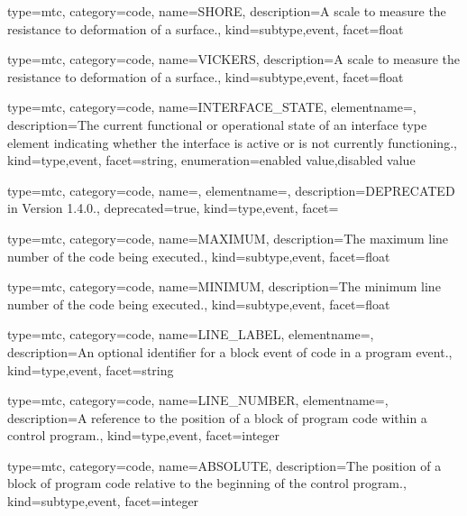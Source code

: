 {
  type=mtc,
  category=code,
  name={SHORE},
  description={A scale to measure the resistance to deformation of a surface.},
  kind={subtype,event},
  facet={\gls{float}}
}


{
  type=mtc,
  category=code,
  name={VICKERS},
  description={A scale to measure the resistance to deformation of a surface.},
  kind={subtype,event},
  facet={\gls{float}}
}


{
  type=mtc,
  category=code,
  name={INTERFACE\_STATE},
  elementname=,
  description={The current functional or operational state of an \gls{interface} type element indicating whether the interface is active or is not currently functioning.},
  kind={type,event},
  facet={\gls{string}},
  enumeration={\gls{enabled value},\gls{disabled value}}
}


{
  type=mtc,
  category=code,
  name=,
  elementname=,
  description={DEPRECATED in Version 1.4.0.},
  deprecated={true},
  kind={type,event},
  facet={}
}


{
  type=mtc,
  category=code,
  name={MAXIMUM},
  description={The maximum line number of the code being executed.},
  kind={subtype,event},
  facet={\gls{float}}
}


{
  type=mtc,
  category=code,
  name={MINIMUM},
  description={The minimum line number of the code being executed.},
  kind={subtype,event},
  facet={\gls{float}}
}


{
  type=mtc,
  category=code,
  name={LINE\_LABEL},
  elementname=,
  description={An optional identifier for a \gls{block event} of code in a \gls{program event}.},
  kind={type,event},
  facet={\gls{string}}
}


{
  type=mtc,
  category=code,
  name={LINE\_NUMBER},
  elementname=,
  description={A reference to the position of a block of program code within a control program.},
  kind={type,event},
  facet={\gls{integer}}
}


{
  type=mtc,
  category=code,
  name={ABSOLUTE},
  description={The position of a block of program code relative to the beginning of the control program.},
  kind={subtype,event},
  facet={\gls{integer}}
}


